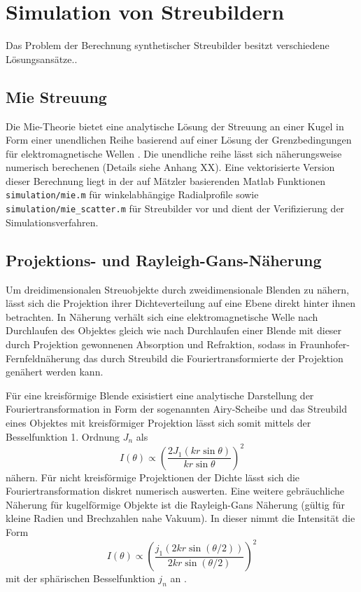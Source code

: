 \chapter{Simulation von Streubildern}
Das Problem der Berechnung synthetischer Streubilder besitzt verschiedene Lösungsansätze..
\section{Mie Streuung}
Die Mie-Theorie bietet eine analytische Lösung der Streuung an einer Kugel  in Form einer unendlichen Reihe basierend auf einer Lösung der Grenzbedingungen für elektromagnetische Wellen \cite{bohren2008}. Die unendliche reihe lässt sich näherungsweise numerisch berechenen (Details siehe Anhang XX). Eine vektorisierte Version dieser Berechnung liegt in der auf Mätzler \cite{maetzler2002} basierenden Matlab Funktionen \texttt{simulation/mie.m} für winkelabhängige Radialprofile sowie \texttt{simulation/mie\_scatter.m} für Streubilder vor und dient der Verifizierung der Simulationsverfahren.

\section{Projektions- und Rayleigh-Gans-Näherung}
	
	Um dreidimensionalen Streuobjekte durch zweidimensionale Blenden zu nähern, lässt sich die Projektion ihrer Dichteverteilung auf eine Ebene direkt hinter ihnen betrachten. In Näherung verhält sich eine elektromagnetische Welle nach Durchlaufen des Objektes gleich wie nach Durchlaufen einer Blende mit dieser durch Projektion gewonnenen Absorption und Refraktion, sodass in Fraunhofer-Fernfeldnäherung das durch Streubild die Fouriertransformierte der Projektion genähert werden kann.
	
	Für eine kreisförmige Blende exisistiert eine analytische Darstellung der Fouriertransformation in Form der sogenannten Airy-Scheibe und das Streubild eines Objektes mit kreisförmiger Projektion lässt sich somit mittels der Besselfunktion 1. Ordnung $J_n$ als
	\begin{equation}
	I(\theta) \propto \left ( \frac{2 J_1(kr \sin \theta)}{kr \sin \theta} \right )^2 
	\end{equation}
	nähern\cite[S. 396]{born1980}. Für nicht kreisförmige Projektionen der Dichte lässt sich die Fouriertransformation diskret numerisch auswerten.
	Eine weitere gebräuchliche Näherung für kugelförmige Objekte ist die Rayleigh-Gans Näherung (gültig für kleine Radien und Brechzahlen nahe Vakuum). In dieser nimmt die Intensität die Form
	\begin{equation}
	    I(\theta)\propto\left ( \frac{j_1(2kr\sin(\theta/2))}{2kr\sin(\theta/2)} \right )^2 
	\end{equation}
	mit der sphärischen Besselfunktion $j_n$ an \cite[S. 163]{bohren2008}. 


